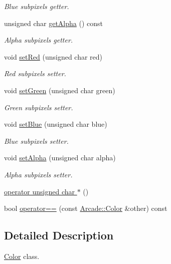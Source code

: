 \begin{DoxyCompactItemize}
\begin{DoxyCompactList}\small\item\em Blue subpixel\textquotesingle{}s getter. \end{DoxyCompactList}\item 
unsigned char \hyperlink{class_arcade_1_1_color_a478438981d4b8b1fc2500b64657d1762}{get\+Alpha} () const
\begin{DoxyCompactList}\small\item\em Alpha subpixel\textquotesingle{}s getter. \end{DoxyCompactList}\item 
void \hyperlink{class_arcade_1_1_color_aec0bb036be18f1fbd746787ae7622914}{set\+Red} (unsigned char red)
\begin{DoxyCompactList}\small\item\em Red subpixel\textquotesingle{}s setter. \end{DoxyCompactList}\item 
void \hyperlink{class_arcade_1_1_color_aebb291f2e113e7c35ff071b96eabf942}{set\+Green} (unsigned char green)
\begin{DoxyCompactList}\small\item\em Green subpixel\textquotesingle{}s setter. \end{DoxyCompactList}\item 
void \hyperlink{class_arcade_1_1_color_ad3032a60897b95c4f7043070d33ba3ae}{set\+Blue} (unsigned char blue)
\begin{DoxyCompactList}\small\item\em Blue subpixel\textquotesingle{}s setter. \end{DoxyCompactList}\item 
void \hyperlink{class_arcade_1_1_color_af73b2d743e93b65c5970b77dfe5bcb77}{set\+Alpha} (unsigned char alpha)
\begin{DoxyCompactList}\small\item\em Alpha subpixel\textquotesingle{}s setter. \end{DoxyCompactList}\item 
\hyperlink{class_arcade_1_1_color_a65ecd14c3b6d508e43f6c2390dfa3215}{operator unsigned char $\ast$} ()
\item 
bool \hyperlink{class_arcade_1_1_color_aa1081f4cf26dbb7a1af8b1a697ded873}{operator==} (const \hyperlink{class_arcade_1_1_color}{Arcade\+::\+Color} \&other) const
\end{DoxyCompactItemize}


\subsection{Detailed Description}
\hyperlink{class_arcade_1_1_color}{Color} class. 

